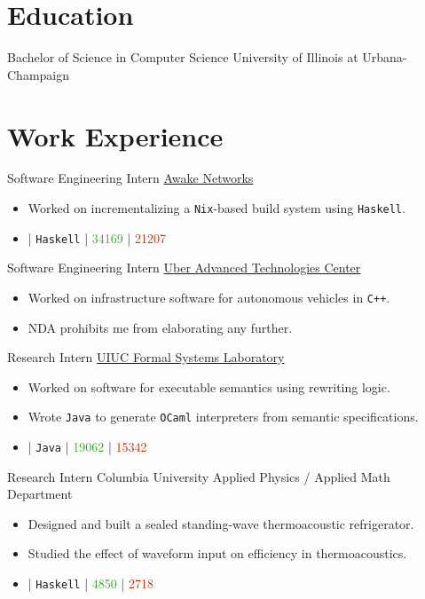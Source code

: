 \documentclass[10pt,letterpaper,sans]{moderncv}
\newcommand{\wlink}[2]{\textcolor[HTML]{0020B6}{\href{#1}{#2}}}
\newcommand{\ghlink}[2]{\wlink{https://github.com/#1}{#2}}
\newcommand{\ghrepo}[1]{\ghlink{#1}{\faGithub}}
\newcommand{\ghlang}[1]{\texttt{#1}}
\newcommand{\ghadd}[1]{\textcolor[HTML]{30A622}{{\faPlusCircle} #1}}
\newcommand{\ghrem}[1]{\textcolor[HTML]{BD2C00}{{\faMinusCircle} #1}}
\newcommand{\ghub}[4]{\ghrepo{#2} | \ghlang{#1} | \ghadd{#3} | \ghrem{#4}}
\newcommand{\lang}[1]{\texttt{#1}}
\begin{document}
\makecvtitle{}

\section{Education}
        {Bachelor of Science in Computer Science}
        {University of Illinois at Urbana-Champaign}
        {}{}
        {}


\section{Work Experience}
        {Software Engineering Intern}
        {\wlink{http://www.awakenetworks.com}{Awake Networks}}
        {}{}
        {
\begin{itemize}
\item Worked on incrementalizing a \lang{Nix}-based build system using \lang{Haskell}.
\item \ghub{Haskell}{awakesecurity/language-ninja}{34169}{21207}
\end{itemize}
}

        {Software Engineering Intern}
        {\wlink{https://www.uber.com/info/atc}{Uber Advanced Technologies Center}}
        {}{}
        {
\begin{itemize}
\item Worked on infrastructure software for autonomous vehicles in \lang{C++}.
\item NDA prohibits me from elaborating any further.
\end{itemize}
}

        {Research Intern}
        {\wlink{http://fsl.cs.illinois.edu}{UIUC Formal Systems Laboratory}}
        {}{}{
\begin{itemize}
\item Worked on software for executable semantics using rewriting logic.
\item Wrote \lang{Java} to generate \lang{OCaml} interpreters from
      semantic specifications.
\item \ghub{Java}{taktoa/k}{19062}{15342}
\end{itemize}
}

        {Research Intern}
        {Columbia University Applied Physics / Applied Math Department}
        {}{}{
\begin{itemize}
\item Designed and built a sealed standing-wave thermoacoustic refrigerator.
\item Studied the effect of waveform input on efficiency in thermoacoustics.
\item \ghub{Haskell}{taktoa/ThermoCalc}{4850}{2718}
\end{itemize}
}
\end{document}
